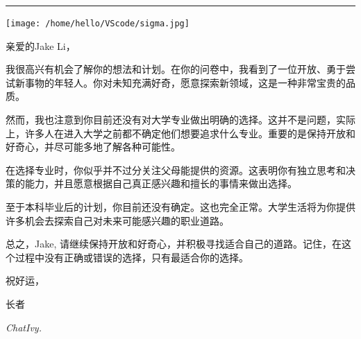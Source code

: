 \documentclass[12pt]{article}
\begin{document}
\begin{CJK*}{UTF8}{gbsn}
\noindent\textcolor{darkblue}{\rule{\textwidth}{5pt}} %



   \begin{center}
      \centering
      \texttt{[image: /home/hello/VScode/sigma.jpg]}
   \end{center}
   \vspace{15mm}


   \newpage
   \fancyfoot[C]{\thepage}
   \vspace*{1cm}
   亲爱的Jake Li，

我很高兴有机会了解你的想法和计划。在你的问卷中，我看到了一位开放、勇于尝试新事物的年轻人。你对未知充满好奇，愿意探索新领域，这是一种非常宝贵的品质。

然而，我也注意到你目前还没有对大学专业做出明确的选择。这并不是问题，实际上，许多人在进入大学之前都不确定他们想要追求什么专业。重要的是保持开放和好奇心，并尽可能多地了解各种可能性。

在选择专业时，你似乎并不过分关注父母能提供的资源。这表明你有独立思考和决策的能力，并且愿意根据自己真正感兴趣和擅长的事情来做出选择。

至于本科毕业后的计划，你目前还没有确定。这也完全正常。大学生活将为你提供许多机会去探索自己对未来可能感兴趣的职业道路。

总之，Jake, 请继续保持开放和好奇心，并积极寻找适合自己的道路。记住，在这个过程中没有正确或错误的选择，只有最适合你的选择。

祝好运，

长者
   \begin{flushleft}
   \textit{\textnormal{ChatIvy.}}
   \end{flushleft}
   \newpage
   \hspace{0pt}
   \vspace{0cm}
   

\end{CJK*}
\end{document}
